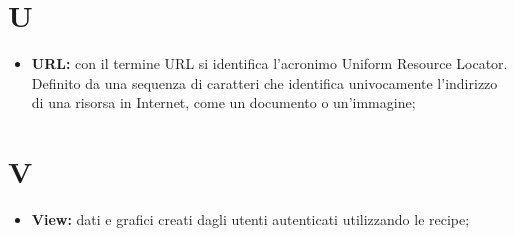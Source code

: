 	\section*{\Huge U} %
		\begin{itemize}
			\item \textbf{URL:} con il termine URL si identifica l’acronimo Uniform Resource Locator. Definito da una sequenza di caratteri che identifica univocamente l’indirizzo di una risorsa in Internet, come un documento o un’immagine;
		\end{itemize}


	\section*{\Huge V} %
		\begin{itemize}
			\item \textbf{View:} dati e grafici creati dagli utenti autenticati utilizzando le recipe;
		\end{itemize}



